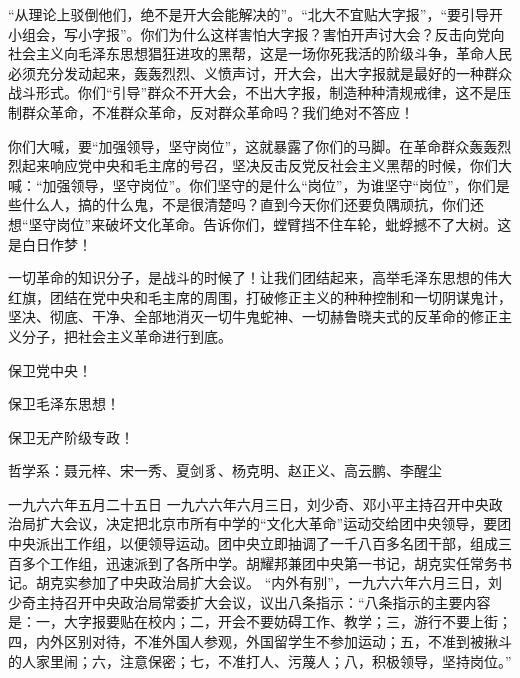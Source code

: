 \begin{maonote}
“从理论上驳倒他们，绝不是开大会能解决的”。“北大不宜贴大字报”，“要引导开小组会，写小字报”。你们为什么这样害怕大字报？害怕开声讨大会？反击向党向社会主义向毛泽东思想猖狂进攻的黑帮，这是一场你死我活的阶级斗争，革命人民必须充分发动起来，轰轰烈烈、义愤声讨，开大会，出大字报就是最好的一种群众战斗形式。你们“引导”群众不开大会，不出大字报，制造种种清规戒律，这不是压制群众革命，不准群众革命，反对群众革命吗？我们绝对不答应！

你们大喊，要“加强领导，坚守岗位”，这就暴露了你们的马脚。在革命群众轰轰烈烈起来响应党中央和毛主席的号召，坚决反击反党反社会主义黑帮的时候，你们大喊：“加强领导，坚守岗位”。你们坚守的是什么“岗位”，为谁坚守“岗位”，你们是些什么人，搞的什么鬼，不是很清楚吗？直到今天你们还要负隅顽抗，你们还想“坚守岗位”来破坏文化革命。告诉你们，螳臂挡不住车轮，蚍蜉撼不了大树。这是白日作梦！

一切革命的知识分子，是战斗的时候了！让我们团结起来，高举毛泽东思想的伟大红旗，团结在党中央和毛主席的周围，打破修正主义的种种控制和一切阴谋鬼计，坚决、彻底、干净、全部地消灭一切牛鬼蛇神、一切赫鲁晓夫式的反革命的修正主义分子，把社会主义革命进行到底。

保卫党中央！

保卫毛泽东思想！

保卫无产阶级专政！

哲学系：聂元梓、宋一秀、夏剑豸、杨克明、赵正义、高云鹏、李醒尘

一九六六年五月二十五日
一九六六年六月三日，刘少奇、邓小平主持召开中央政治局扩大会议，决定把北京市所有中学的“文化大革命”运动交给团中央领导，要团中央派出工作组，以便领导运动。团中央立即抽调了一千八百多名团干部，组成三百多个工作组，迅速派到了各所中学。胡耀邦兼团中央第一书记，胡克实任常务书记。胡克实参加了中央政治局扩大会议。
“内外有别”，一九六六年六月三日，刘少奇主持召开中央政治局常委扩大会议，议出八条指示：“八条指示的主要内容是：一，大字报要贴在校内；二，开会不要妨碍工作、教学；三，游行不要上街；四，内外区别对待，不准外国人参观，外国留学生不参加运动；五，不准到被揪斗的人家里闹；六，注意保密；七，不准打人、污蔑人；八，积极领导，坚持岗位。”
\end{maonote}
